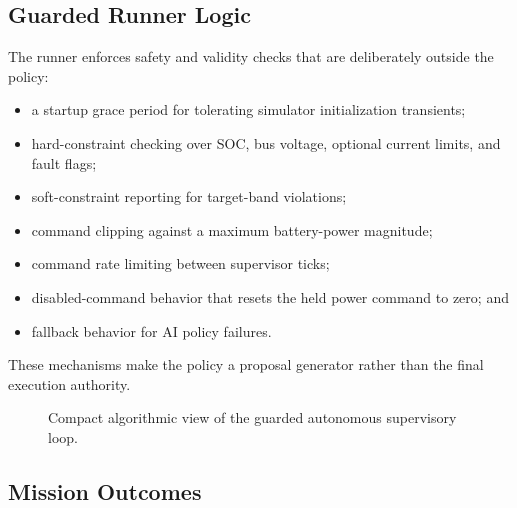 \documentclass[conference]{IEEEtran}
\begin{document}
\subsection{Guarded Runner Logic}

The runner enforces safety and validity checks that are deliberately outside
the policy:
\begin{itemize}
    \item a startup grace period for tolerating simulator initialization
    transients;
    \item hard-constraint checking over SOC, bus voltage, optional current
    limits, and fault flags;
    \item soft-constraint reporting for target-band violations;
    \item command clipping against a maximum battery-power magnitude;
    \item command rate limiting between supervisor ticks;
    \item disabled-command behavior that resets the held power command to
    zero; and
    \item fallback behavior for AI policy failures.
\end{itemize}
These mechanisms make the policy a proposal generator rather than the final
execution authority.

\begin{figure}[t]
\centering
{}
\caption{Compact algorithmic view of the guarded autonomous supervisory loop.}
\label{fig:algorithm}
\end{figure}

\subsection{Mission Outcomes}
\end{document}
